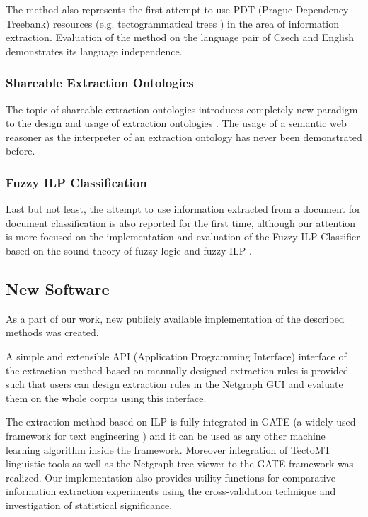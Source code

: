 \documentclass[12pt,a4paper,twoside,notitlepage]{article}
\begin{document}
The method also represents the first attempt to use PDT (Prague Dependency Treebank) resources (e.g. tectogrammatical trees \citep{biblio:MiBeAnnotationtectogrammatical2006}) in the area of information extraction. Evaluation of the method on the language pair of Czech and English demonstrates its language independence.

\subsubsection{Shareable Extraction Ontologies}
The topic of shareable extraction ontologies introduces completely new paradigm to the design and usage of extraction ontologies \citep{DBLP:conf/er/EmbleyTL02}. The usage of a semantic web reasoner as the interpreter of an extraction ontology has never been demonstrated before.


\subsubsection{Fuzzy ILP Classification}
Last but not least, the attempt to use information extracted from a document for document classification is also reported for the first time, although our attention is more focused on the implementation and evaluation of the Fuzzy ILP Classifier based on the sound theory of fuzzy logic \citep{biblio:Hajek} and fuzzy ILP \citep{biblio:FILP}.



\subsection{New Software}

As a part of our work, new publicly available implementation of the described methods was created. 

A simple and extensible API (Application Programming Interface) interface of the extraction method based on manually designed extraction rules is provided such that users can design extraction rules in the Netgraph GUI and evaluate them on the whole corpus using this interface. 

The extraction method based on ILP is fully integrated in GATE (a widely used framework for text engineering \citep{biblio:GATE_ACL2002}) and it can be used as any other machine learning algorithm inside the framework. Moreover integration of TectoMT linguistic tools \citep{biblio:ZaPtTectoMTHighly2008} as well as the Netgraph tree viewer to the GATE framework was realized. Our implementation also provides utility functions for  comparative information extraction experiments using the cross-validation technique and investigation of statistical significance. 
\end{document}
